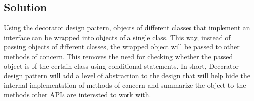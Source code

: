 \subsection*{Solution}

Using the decorator design pattern, objects of different classes that implement an interface can be wrapped into objects of a single class.
This way, instead of passing objects of different classes, the wrapped object will be passed to other methods of concern.
This removes the need for checking whether the passed object is of the certain class using conditional statements.
In short, Decorator design pattern will add a level of abstraction to the design that will help hide the internal implementation of methods of concern and summarize the object to the methods other APIs are interested to work with.
